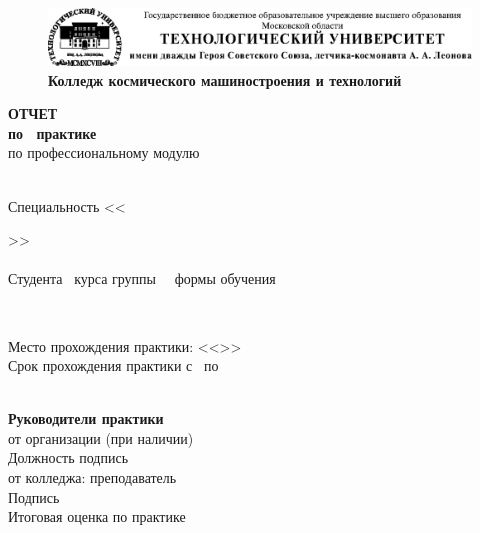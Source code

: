 \begin{titlepage}
	\begin{figure}[ht]
		\centering
		\includegraphics[scale = 0.9]{fig/head.eps}\\[\medskipamount]
		\textbf{Колледж космического машиностроения и технологий}\\[\bigskipamount]
	\end{figure}

	\begin{center}
		\textbf{ОТЧЕТ\\по \practype\ практике	\pracnum}\\
		по профессиональному модулю \module \\[\bigskipamount]
		\ \\[\bigskipamount]
		\begin{flushleft}
			Специальность <<\special>>\\[\bigskipamount]
			\ \\[\bigskipamount]
			Студента \course\ курса группы \group\ \form\ формы обучения\\
		\end{flushleft}
		\textbf{}\\[\bigskipamount]
		\begin{flushleft}
			Место прохождения практики: <<\place>>\\
			Срок прохождения практики с \startdate\ по \fisting\\[\bigskipamount]
			\ \\[\bigskipamount]
		\end{flushleft}
		\textbf{Руководители практики}\\[\bigskipamount]
		от организации (при наличии)\hrulefill\\
		{\scriptsize Должность	подпись\\}
		от  колледжа:        преподаватель\ \hrulefill\ \fullmaster\\
		{\scriptsize Подпись\\}
		Итоговая оценка по практике \hrulefill



	\end{center}
\end{titlepage} %
\setcounter{page}{2}
\clearpage
